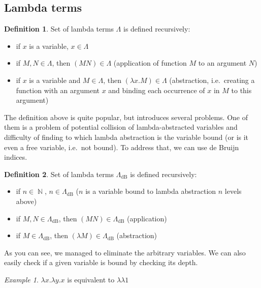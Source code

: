 \documentclass[final]{article}
\theoremstyle{definition}
\newtheorem{definition}{Definition}[subsection]
\theoremstyle{definition}
\theoremstyle{remark}
\newtheorem{example}{Example}[subsection]
\newcommand{\LambdadB}{\ensuremath{\Lambda_{\text{dB}}}}
\DeclareMathOperator{\N}{\mathbb{N}}
\begin{document}
\subsection{Lambda terms}%
\label{sub:lambda_terms}

\begin{definition}
    Set of lambda terms \(\Lambda\) is defined recursively:
    \begin{itemize}
        \item if \(x\) is a variable, \(x \in \Lambda\)
        \item if \(M, N \in \Lambda\), then \((M N) \in \Lambda\) (application of function \(M\) to an argument \(N\))
        \item if \(x\) is a variable and \(M \in \Lambda\), then \((\lambda x . M) \in \Lambda\) (abstraction, i.e.\ creating a function with an argument \(x\) and binding each occurrence of \(x\) in \(M\) to this argument)
    \end{itemize}
\end{definition}

The definition above is quite popular, but introduces several problems. One of them is a problem of potential collision of lambda-abstracted variables and difficulty of finding to which lambda abstraction is the variable bound (or is it even a free variable, i.e.\ not bound). To address that, we can use de Bruijn indices.

\begin{definition}
    Set of lambda terms \(\LambdadB\) is defined recursively:
    \begin{itemize}
        \item if \(n \in \N\), \(n \in \LambdadB\) (\(n\) is a variable bound to lambda abstraction \(n\) levels above)
        \item if \(M, N \in \LambdadB\), then \((M N) \in \LambdadB\) (application)
        \item if \(M \in \LambdadB\), then \((\lambda M) \in \LambdadB\) (abstraction)
    \end{itemize}
\end{definition}

As you can see, we managed to eliminate the arbitrary variables. We can also easily check if a given variable is bound by checking its depth.

\begin{example}
    \(\lambda x . \lambda y . x\) is equivalent to \(\lambda \lambda 1\)
\end{example}
\end{document}
